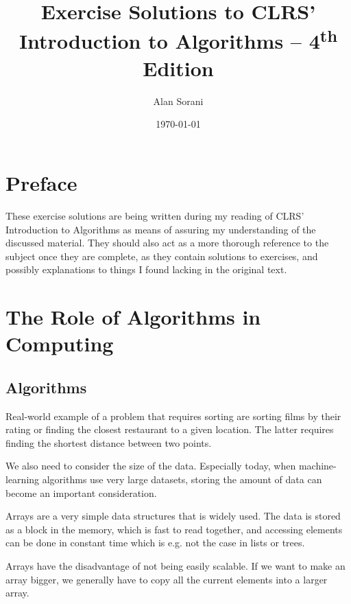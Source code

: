 \documentclass[oneside]{scrbook}
\title{Exercise Solutions to CLRS' Introduction to Algorithms -- 4\textsuperscript{th} Edition}
\author{Alan Sorani}
\date{\today}
\theoremstyle{definition}
\begin{document}
\maketitle
\tableofcontents

\chapter*{Preface}

These exercise solutions are being written %
during my reading of CLRS' Introduction to Algorithms \cite{intro-to-algorithms-4}
as means of assuring my understanding of the discussed material.
They should also act as a more thorough reference to the subject once they are complete,
as they contain solutions to exercises, and possibly explanations to things I found lacking in the original text.


\chapter{The Role of Algorithms in Computing}

\section{Algorithms}

\begin{exercise}
    Real-world example of a problem that requires sorting are sorting films by their rating or finding the closest restaurant to a given location. The latter requires finding the shortest distance between two points.
\end{exercise}

\begin{exercise}
    We also need to consider the size of the data. Especially today, when machine-learning algorithms use very large datasets, storing the amount of data can become an important consideration.
\end{exercise}

\begin{exercise}
    Arrays are a very simple data structures that is widely used. The data is stored as a block in the memory, which is fast to read together, and accessing elements can be done in constant time which is e.g. not the case in lists or trees.

    Arrays have the disadvantage of not being easily scalable. If we want to make an array bigger, we generally have to copy all the current elements into a larger array.
\end{exercise}
\end{document}
